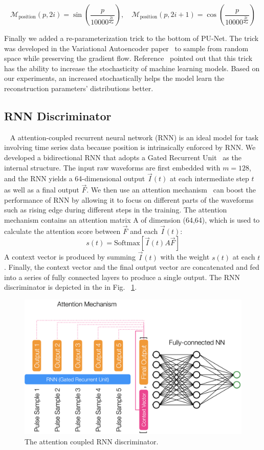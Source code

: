 \begin{equation}
\mathcal{M}_{\mathrm{position}}(p, 2i) = \sin\left(\frac{p}{10000^{\frac{2i}{\mathcal{d}_{\mathcal{ch}}}}}\right), \quad
\mathcal{M}_{\mathrm{position}}(p, 2i+1) = \cos\left(\frac{p}{10000^{\frac{2i}{\mathcal{d}_{\mathcal{ch}}}}}\right)
\label{eqn:positional_encoding}
\end{equation}

Finally we added a re-parameterization trick to the bottom of PU-Net. The trick was developed in the Variational Autoencoder paper~\cite{VAE} to sample from random space while preserving the gradient flow. Reference~\cite{AAE} pointed out that this trick has the ability to increase the stochasticity of machine learning models. Based on our experiments, an increased stochastically helps the model learn the reconstruction parameters' distributions better.

\subsection{RNN Discriminator}~\label{subapp:RNN}
A attention-coupled recurrent neural network (RNN)\cite{attention} is an ideal model for task involving time series data because position is intrinsically enforced by RNN. We developed a bidirectional RNN that adopts a Gated Recurrent Unit~\cite{GRU} as the internal structure. The input raw waveforms are first embedded with $m=128$, and the RNN yields a 64-dimensional output $\vec{I}(t)$ at each intermediate step $t$ as well as a final output  $\vec{F}$. We then use an attention mechanism~\cite{attention} can boost the performance of RNN by allowing it to focus on different parts of the waveforms such as rising edge during different steps in the training. The attention mechanism contains an attention matrix A of dimension (64,64), which is used to calculate the attention score between $\vec{F}$ and each $\vec{I}(t)$:
\begin{equation}
    s(t) = \mathrm{Softmax}[\vec{I}(t) A \vec{F}]
\end{equation}
A context vector is produced by summing $\vec{I}(t)$ with the weight $s(t)$ at each $t$. Finally, the context vector and the final output vector are concatenated and fed into a series of fully connected layers to produce a single output. The RNN discriminator is depicted in the in Fig. ~\ref{fig:detail_network}.

\begin{figure}[htb!]
    \centering

    \includegraphics[width=0.7\linewidth,trim={0pc 0pc 0pc 0pc},clip]{ch6/figs/rnnAttention.png}
    \caption{The attention coupled RNN discriminator.}
    \label{fig:detail_network}
\end{figure}



